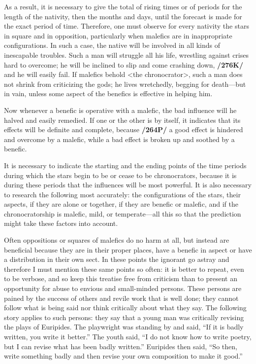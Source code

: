 As a result, it is necessary to give the total of rising times or of periods for the length of the nativity, then the months and days, until the forecast is made for the exact period of time. \mndl Therefore, one must observe for every nativity the stars in square and in opposition, particularly when malefics are in inappropriate configurations. In such a case, the native will be involved in all kinds of inescapable troubles. Such a man will struggle all his life, wrestling against crises hard to overcome; he will be inclined to slip and come crashing down, \textbf{/276K/} and he will easily fail. If malefics behold <the chronocrator>, such a man does not shrink from criticizing the gods; he lives wretchedly, begging for death—but in vain, unless some aspect of the benefics is effective in helping him. 

Now \mndl whenever a benefic is operative with a malefic, the bad influence will he halved and easily remedied. If one or the other is by itself, it indicates that its effects will be definite and complete, because \textbf{/264P/} a good effect is hindered and overcome by a malefic, while a bad effect is broken up and soothed by a benefic.

It  is necessary to indicate the starting and the ending points of the time periods during which the stars begin to be or cease to be chronocrators, because it is during these periods that the influences will be most
powerful. It is also necessary to research the following most accurately: the configurations of the stars, their aspects, if they are alone or together, if they are benefic or malefic, and if the chronocratorship is malefic, mild, or temperate—all this so that the prediction might take these factors into account. 

Often \mnmb oppositions or squares of malefics do no harm at all, but instead are beneficial because they are in their proper places, have a benefic in aspect or have a distribution in their own sect. In these points the ignorant go astray and therefore I must mention these same points so often: it is better to repeat, even to be verbose, and so keep this treatise free from criticism than to present an opportunity for abuse to envious and small-minded persons. These persons are pained by the success of others and revile work that is well done; they cannot follow what is being said nor think critically about what they say. The following story applies to such persons: they say that a young man was critically
revising the plays of Euripides. The playwright was standing by and said, “If it is badly written, you write it better.” The youth said, “I do not know how to write poetry, but I can revise what has been badly
written.” Euripides then said, “So then, write something badly and then revise your own composition to make it good.” 

